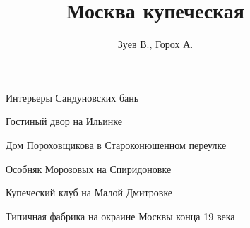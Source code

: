 \documentclass[fullscreen=true,unicode,bookmarks=false]{beamer}
\author{Зуев В., Горох А.}
\institute{Лицей ФТШ}
\title{Москва купеческая}
\begin{document}
\begin{frame}
\titlepage
\end{frame}

\begin{frame}
\begin{figure}[h!]
\caption{Интерьеры Сандуновских бань}
\end{figure}
\end{frame}

\begin{frame}
\begin{figure}[h!]
\caption{Гостиный двор на Ильинке}
\end{figure}
\end{frame}

\begin{frame}
\begin{figure}[h!]
\caption{Дом Пороховщикова в Староконюшенном переулке}
\end{figure}
\end{frame}

\begin{frame}
\begin{figure}[h!]
\caption{Особняк Морозовых на Спиридоновке}
\end{figure}
\end{frame}

\begin{frame}
\begin{figure}[h!]
\caption{Купеческий клуб на Малой Дмитровке}
\end{figure}
\end{frame}

\begin{frame}
\begin{figure}[h!]
\caption{Типичная фабрика на окраине Москвы конца 19 века}
\end{figure}
\end{frame}
\end{document}
